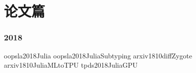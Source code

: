 \newpage
\part{论文篇}

\newpage
\section{2018}
{oopsla2018Julia}
{oopsla2018JuliaSubtyping}
{arxiv1810diffZygote}
{arxiv1810JuliaMLtoTPU}
{tpds2018JuliaGPU}